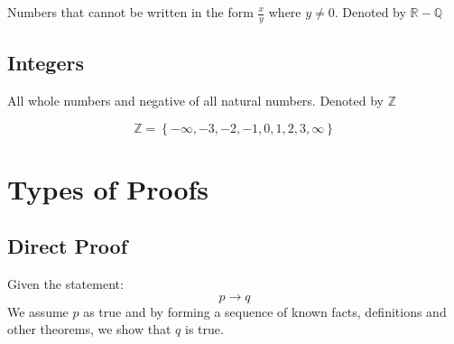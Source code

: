 \documentclass[12pt letter]{report}
\begin{document}
Numbers that cannot be written in the form $\frac{x}{y}$ where $y \neq 0$. Denoted by $\mathbb{R} - \mathbb{Q}$


\subsection{Integers}

All whole numbers and negative of all natural numbers. Denoted by $\mathbb{Z}$

\[
  \mathbb{Z} = \left\{ -\infty, -3, -2, -1, 0, 1, 2, 3, \infty \right\}
\]

\section{Types of Proofs}

\subsection{Direct Proof}

Given the statement:
\[
  p \to q
\]
We assume $p$ as true and by forming a sequence of known facts, definitions and other theorems, we show that $q$ is true.

\end{document}
